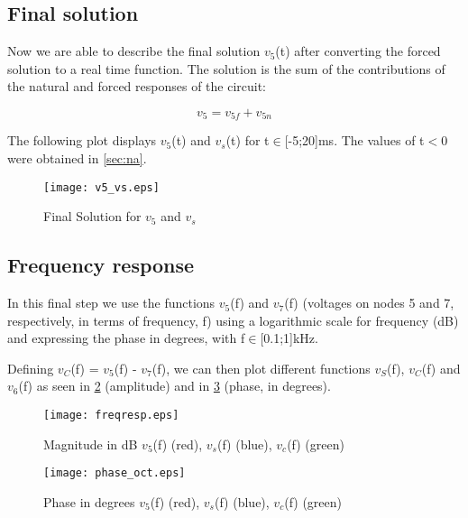 \subsection{Final solution}

Now we are able to describe the final solution $v_5$(t) after converting the forced solution to a real time function. The solution is the sum of the contributions of the natural and forced responses of the circuit:  

\begin{equation}
  v_5 = v_{5f} + v_{5n}
  \label{eq:kvl20}
\end{equation}

The following plot displays $v_5$(t) and $v_s$(t) for t$\in$[-5;20]ms. The values of t$<$0 were obtained in \ref{sec:na}.

\begin{figure}[h] \centering
\texttt{[image: v5\_vs.eps]}
\caption{Final Solution for $v_5$ and $v_s$}
\label{fig:v5_vs}
\end{figure}
\FloatBarrier

\subsection{Frequency response}
\label{sec:frequency}

In this final step we use the functions $v_5$(f) and $v_7$(f) (voltages on nodes 5 and 7, respectively, in terms of frequency, f) using a logarithmic scale for frequency (dB) and expressing the phase in degrees, with f$\in$[0.1;1]kHz. \par
Defining $v_C$(f) = $v_5$(f) - $v_7$(f), we can then plot different functions $v_S$(f), $v_C$(f) and $v_6$(f) as seen in \ref{fig:freqresp} (amplitude) and in \ref{fig:phase_oct} (phase, in degrees).


\begin{figure}[h] \centering
\texttt{[image: freqresp.eps]}
\caption{Magnitude in dB $v_5$(f) (red), $v_s$(f) (blue), $v_c$(f) (green)}
\label{fig:freqresp}
\end{figure}
\FloatBarrier

\begin{figure}[h] \centering
\texttt{[image: phase\_oct.eps]}
\caption{Phase in degrees $v_5$(f) (red), $v_s$(f) (blue), $v_c$(f) (green)}
\label{fig:phase_oct}
\end{figure}
\FloatBarrier

